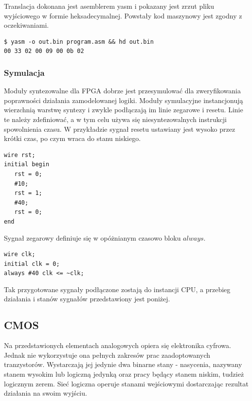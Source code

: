 \documentclass[a4paper,12pt]{article}
\begin{document}
Translacja dokonana jest asemblerem yasm i pokazany jest zrzut pliku wyjściowego w formie heksadecymalnej. Powstały kod maszynowy jest zgodny z oczekiwaniami.
\begin{lstlisting}[label=translacja,caption=Translacja]
$ yasm -o out.bin program.asm && hd out.bin
00 33 02 00 09 00 0b 02
\end{lstlisting}

\subsubsection{Symulacja}



Moduły syntezowalne dla FPGA dobrze jest przesymulować dla zweryfikowania poprawności działania zamodelowanej logiki. Moduły symulacyjne instancjonują wierzchnią warstwę syntezy i zwykle podłączają im linie zegarowe i resetu. Linie te należy zdefiniować, a w tym celu używa się niesyntezowalnych instrukcji spowolnienia czasu. W przykładzie sygnał resetu ustawiany jest wysoko przez krótki czas, po czym wraca do stanu niskiego.
\begin{lstlisting}[label=reset,caption=Reset]
wire rst;
initial begin
   rst = 0;
   #10;
   rst = 1;
   #40;
   rst = 0;
end
\end{lstlisting}

Sygnał zegarowy definiuje się w opóżnianym czasowo bloku $always$.
\begin{lstlisting}[label=clk,caption=Clk]
wire clk;
initial clk = 0;
always #40 clk <= ~clk;
\end{lstlisting}

Tak przygotowane sygnały podłączone zostają do instancji CPU, a przebieg działania i stanów sygnałów przedstawiony jest poniżej.

\subsection{CMOS}

Na przedstawionych elementach analogowych opiera się elektronika cyfrowa. Jednak nie wykorzystuje ona pełnych zakresów prac zaadoptowanych tranzystorów. Wystarczają jej jedynie dwa binarne stany - nasycenia, nazywany stanem wysokim lub logiczną jedynką oraz pracy będący stanem niskim, tudzież logicznym zerem. Sieć logiczna operuje stanami wejściowymi dostarczając rezultat działania na swoim wyjściu.
\end{document}
